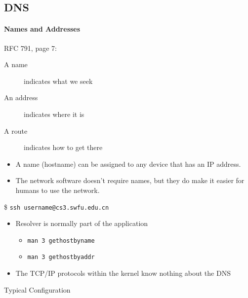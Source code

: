 \subsection{DNS}

\begin{frame}\framesubtitle{Names and Addresses}
  \begin{iblock}{RFC 791, page 7:}
    \begin{description}
    \item[A name] indicates what we seek
    \item[An address] indicates where it is
    \item[A route] indicates how to get there
    \end{description}
  \end{iblock}
  \begin{itemize}
  \item A name (hostname) can be assigned to any device that has an IP address.
  \item The network software doesn't require names, but they do make it easier for humans
    to use the network.
  \end{itemize}
\end{frame}

\begin{frame}
  \begin{iblock}{\$ \texttt{ssh username@cs3.swfu.edu.cn}}
    \begin{center}
    \end{center}
  \end{iblock}
  \begin{itemize}
  \item Resolver is normally part of the application
    \begin{itemize}
    \item \texttt{man 3 gethostbyname}
    \item \texttt{man 3 gethostbyaddr}
    \end{itemize}
  \item The TCP/IP protocols within the kernel know nothing about the DNS
  \end{itemize}
\end{frame}

\begin{frame}{Typical Configuration}
  \begin{center}
     
  \end{center}
\end{frame}

